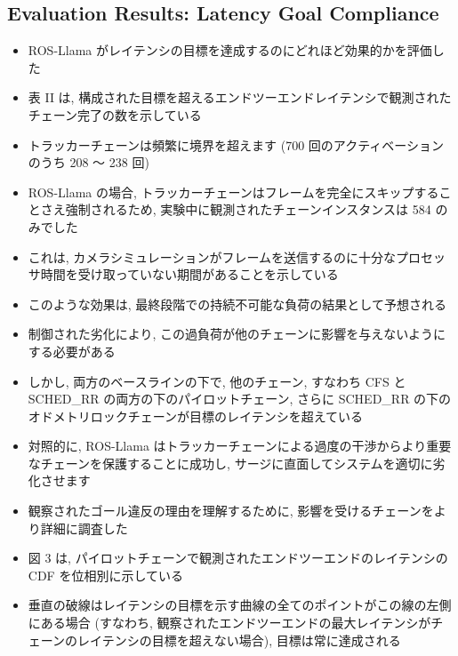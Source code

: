 \subsection{Evaluation Results: Latency Goal Compliance}
\label{ssec: evaluation results: latency goal compliance}

\begin{frame}{}
    \begin{itemize}
        \item ROS-Llama がレイテンシの目標を達成するのにどれほど効果的かを評価した
\item 表 II は, 構成された目標を超えるエンドツーエンドレイテンシで観測されたチェーン完了の数を示している
    \end{itemize}
\end{frame}

\begin{frame}{}
    \begin{itemize}
        \item トラッカーチェーンは頻繁に境界を超えます (700 回のアクティベーションのうち 208 ～ 238 回)
\item ROS-Llama の場合, トラッカーチェーンはフレームを完全にスキップすることさえ強制されるため, 実験中に観測されたチェーンインスタンスは 584 のみでした
\item これは, カメラシミュレーションがフレームを送信するのに十分なプロセッサ時間を受け取っていない期間があることを示している
    \end{itemize}
\end{frame}

\begin{frame}{}
    \begin{itemize}
        \item このような効果は, 最終段階での持続不可能な負荷の結果として予想される
\item 制御された劣化により, この過負荷が他のチェーンに影響を与えないようにする必要がある
\item しかし, 両方のベースラインの下で, 他のチェーン, すなわち CFS と SCHED\_RR の両方の下のパイロットチェーン, さらに SCHED\_RR の下のオドメトリロックチェーンが目標のレイテンシを超えている
\item 対照的に, ROS-Llama はトラッカーチェーンによる過度の干渉からより重要なチェーンを保護することに成功し, サージに直面してシステムを適切に劣化させます
    \end{itemize}
\end{frame}

\begin{frame}{}
    \begin{itemize}
        \item 観察されたゴール違反の理由を理解するために, 影響を受けるチェーンをより詳細に調査した
\item 図 3 は, パイロットチェーンで観測されたエンドツーエンドのレイテンシの CDF を位相別に示している
\item 垂直の破線はレイテンシの目標を示す曲線の全てのポイントがこの線の左側にある場合 (すなわち, 観察されたエンドツーエンドの最大レイテンシがチェーンのレイテンシの目標を超えない場合), 目標は常に達成される
    \end{itemize}
\end{frame}

